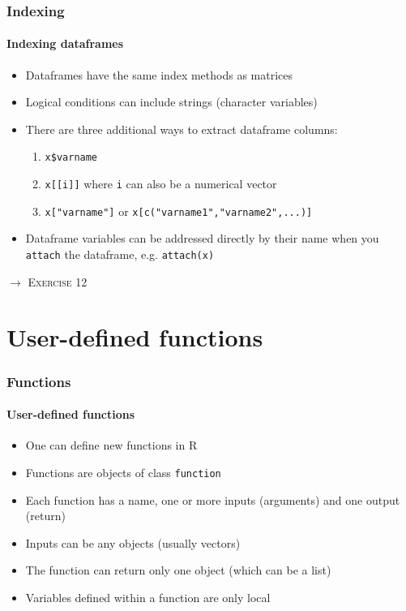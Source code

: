 \documentclass[title={Introduction to R}, author={Mutschler and Zaharieva}, inst={Institute for Econometrics and Empirical Economics}]{beamer}
\begin{document}
\begin{frame}
\frametitle{Indexing}
\framesubtitle{Indexing dataframes}
\begin{itemize}
\item Dataframes have the same index methods as matrices
\item Logical conditions can include strings (character variables)
\item There are three additional ways to extract dataframe columns:
\begin{enumerate}
\item \texttt{x\$varname}
\item \texttt{x[[i]]} \newline
where \texttt{i} can also be a numerical vector
\item \texttt{x["varname"]} \newline
or \texttt{x[c("varname1","varname2",...)]}
\end{enumerate}
\item Dataframe variables can be addressed directly by their name when you 
\texttt{attach} the dataframe, e.g. \texttt{attach(x)}
\end{itemize}\pause
$\longrightarrow $ \textsc{Exercise 12}
\end{frame}


\section{User-defined functions} 
\begin{frame}
\frametitle{Functions}
\framesubtitle{User-defined functions}
\begin{itemize}
\item One can define new functions in R
\item Functions are objects of class \texttt{function}
\item Each function has a name, one or more inputs (arguments) \newline
and one output (return)
\item Inputs can be any objects (usually vectors)
\item The function can return only one object (which can be a list)
\item Variables defined within a function are only local
\end{itemize}
\end{frame}
\end{document}
